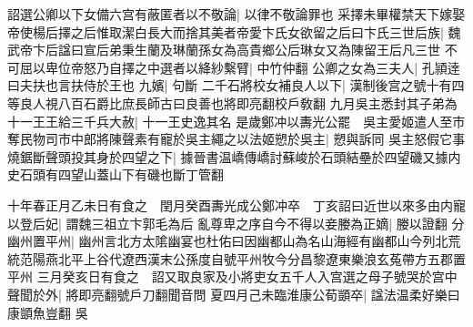 詔選公卿以下女備六宫有蔽匿者以不敬論|{
	以律不敬論罪也}
采擇未畢權禁天下嫁娶帝使楊后擇之后惟取潔白長大而捨其美者帝愛卞氏女欲留之后曰卞氏三世后族|{
	魏武帝卞后諡曰宣后弟秉生蘭及琳蘭孫女為高貴鄉公后琳女又為陳留王后凡三世}
不可屈以卑位帝怒乃自擇之中選者以絳紗繫臂|{
	中竹仲翻}
公卿之女為三夫人|{
	孔頴逹曰夫扶也言扶侍於王也}
九嬪|{
	句斷}
二千石將校女補良人以下|{
	漢制後宫之號十有四等良人視八百石爵比庶長師古曰良善也將即亮翻校戶敎翻}
九月吳主悉封其子弟為十一王王給三千兵大赦|{
	十一王史逸其名}
是歲鄭冲以夀光公罷　吳主愛姬遣人至市奪民物司市中郎將陳聲素有寵於吳主繩之以法姬愬於吳主|{
	愬與訴同}
吳主怒假它事燒鋸斷聲頭投其身於四望之下|{
	據晉書温嶠傳嶠討蘇峻於石頭結壘於四望磯又據内史石頭有四望山蓋山下有磯也斷丁管翻}


十年春正月乙未日有食之　閏月癸酉夀光成公鄭冲卒　丁亥詔曰近世以來多由内寵以登后妃|{
	謂魏三祖立卞郭毛為后}
亂尊卑之序自今不得以妾媵為正嫡|{
	媵以證翻}
分幽州置平州|{
	幽州言北方太隂幽宴也杜佑曰因幽都山為名山海經有幽都山今列北荒統范陽燕北平上谷代遼西漢末公孫度自號平州牧今分昌黎遼東樂浪玄菟帶方五郡置平州}
三月癸亥日有食之　詔又取良家及小將吏女五千人入宫選之母子號哭於宫中聲聞於外|{
	將即亮翻號戶刀翻聞音問}
夏四月己未臨淮康公荀顗卒|{
	諡法温柔好樂曰康顗魚豈翻}
吳

